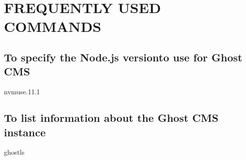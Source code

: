 \documentclass[letterpaper,10pt,english]{sphinxmanual}
\begin{document}
\begin{sphinxVerbatim}[commandchars=\\\{\}]
\PYG{p}{[}
\PYG{p}{]}
\end{sphinxVerbatim}

\sphinxstepscope


\chapter{FREQUENTLY USED COMMANDS}
\label{\detokenize{frequent_commands:frequently-used-commands}}\label{\detokenize{frequent_commands::doc}}

\section{To specify the Node.js versionto use for Ghost CMS}
\label{\detokenize{frequent_commands:to-specify-the-node-js-versionto-use-for-ghost-cms}}
\begin{sphinxVerbatim}[commandchars=\\\{\}]
\PYGZdl{}nvmuse.11.1
\end{sphinxVerbatim}


\section{To list information about the Ghost CMS instance}
\label{\detokenize{frequent_commands:to-list-information-about-the-ghost-cms-instance}}
\begin{sphinxVerbatim}[commandchars=\\\{\}]
\PYGZdl{}ghostls
\end{sphinxVerbatim}



\renewcommand{\indexname}{Index}
\printindex
\end{document}
